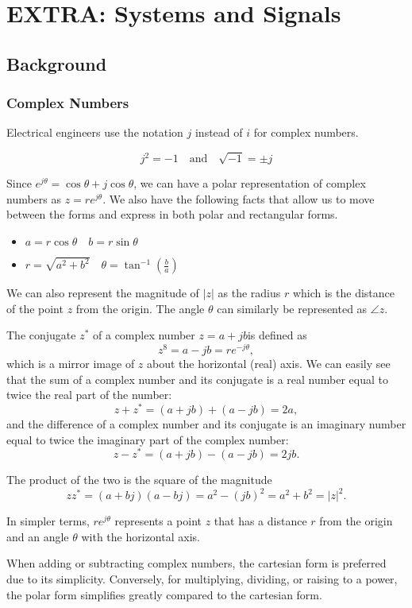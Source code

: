 \section{EXTRA: Systems and Signals}
\subsection{Background}
\subsubsection{Complex Numbers}
Electrical engineers use the notation $j$ instead of $i$ for complex numbers.

\begin{equation}
    j^2 = -1 \quad \text{and} \quad \sqrt{-1} = \pm j
\end{equation}

Since $e^{j \theta} = \cos \theta + j \cos \theta$, we can have a polar representation of complex numbers as $z = re^{j \theta}$.
We also have the following facts that allow us to move between the forms and express in both polar and rectangular forms.
\begin{itemize}
    \item $a = r \cos \theta \quad b = r \sin \theta$
    \item $r = \sqrt{a^2 + b^2} \quad \theta = \tan^{-1} (\frac{b}{a}) $
\end{itemize} 

We can also represent the magnitude of $|z|$ as the radius $r$ which is the distance of the point $z$ from the origin.
The angle $\theta$ can similarly be represented as $\angle z$.

The conjugate $z^*$ of a complex number $z=a+jb$is defined as 
\begin{equation}
    z^8 = a - jb = re^{-j \theta},
\end{equation}
which is a mirror image of $z$ about the horizontal (real) axis.
We can easily see that the sum of a complex number and its conjugate is a real number equal to twice the real part of the number:
\begin{equation}
    z + z^* = (a+jb) + (a-jb) = 2a,
\end{equation}
and the difference of a complex number and its conjugate is an imaginary number equal to twice the imaginary part of the complex number:
\begin{equation}
    z - z^* = (a+jb) - (a-jb) = 2jb.
\end{equation}

The product of the two is the square of the magnitude
\begin{equation}
    zz^* = (a+bj)(a-bj) = a^2 -(jb)^2 = a^2 + b^2 = |z|^2.
\end{equation}

In simpler terms, $re^{j\theta}$ represents a point $z$ that has a distance $r$ from the origin and an angle $\theta$ with the horizontal axis.

When adding or subtracting complex numbers, the cartesian form is preferred due to its simplicity.
Conversely, for multiplying, dividing, or raising to a power, the polar form simplifies greatly compared to the cartesian form.
